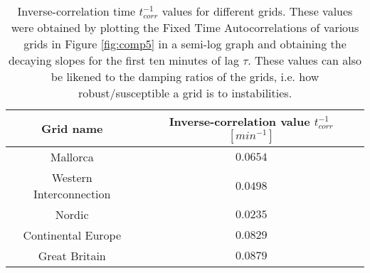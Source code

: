 \documentclass[varwidth=\maxdimen]{standalone}
\begin{document}
	\begin{table}[h]
		\caption{Inverse-correlation time $t_{corr}^{-1}$ values for different grids. These values were obtained by plotting the Fixed Time Autocorrelations of various grids in Figure \ref{fig:comp5} in a semi-log graph and obtaining the decaying slopes for the first ten minutes of lag $\tau$. These values can also be likened to the damping ratios of the grids, i.e. how robust/susceptible a grid is to instabilities.}
		\label{tab:invCorr}
		\centering
		\begin{tabular}{ c  c}
			\toprule
			Grid name & Inverse-correlation value $t_{corr}^{-1}$ $[min^{-1}]$\\[0pt]
			\midrule
			Mallorca & $0.0654$\\[0pt]
	
			Western Interconnection & $0.0498$\\[0pt]

			Nordic & $0.0235$\\[0pt]
	
			Continental Europe & $0.0829$\\[0pt]

			Great Britain & $0.0879$\\[0pt]
			\bottomrule			
		\end{tabular}
	\end{table}
\end{document}
